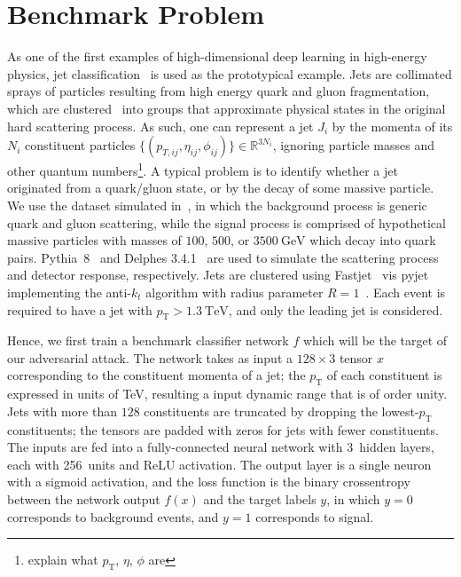 \documentclass[reprint,nofootinbib,...]{revtex4-1}
\newcommand{\nconst}{128}       %
\newcommand{\nlayerCLS}{3}     %
\newcommand{\nunitsCLS}{256} %
\newcommand{\pt}{p_\mathrm{T}} %
\begin{document}
\section{Benchmark Problem}

As one of the first examples of high-dimensional deep learning in high-energy physics, jet classification~\cite{Larkoski:2017jix} is used as the prototypical example.
Jets are collimated sprays of particles resulting from high energy quark and gluon fragmentation, which are clustered~\cite{Cacciari:2008gp} into groups that approximate physical states in the original hard scattering process.
As such, one can represent a jet $J_i$ by the momenta of its $N_i$ constituent particles $\{(p_{T,ij},\eta_{ij},\phi_{ij})\}\in\mathbb{R}^{3N_i}$, ignoring particle masses and other quantum numbers\footnote{explain what $p_\mathrm{T}$, $\eta$, $\phi$ are}.
A typical problem is to identify whether a jet originated from a quark/gluon state, or by the decay of some massive particle.
We use the dataset simulated in~\cite{gregor_kasieczka_2019_2629073}, in which the background process is generic quark and gluon scattering, while the signal process is comprised of hypothetical massive particles with masses of $100$, $500$, or $3500\ \mathrm{GeV}$ which decay into quark pairs.
Pythia~8~\cite{Sjostrand:2006za,Sjostrand:2007gs} and Delphes 3.4.1~\cite{deFavereau:2013fsa} are used to simulate the scattering process and detector response, respectively.
Jets are clustered using Fastjet~\cite{Cacciari:2011ma,Cacciari:2005hq} vis pyjet~\cite{noel_dawe_2019_2672944} implementing the anti-$k_t$ algorithm with radius parameter $R=1$~\cite{Cacciari:2008gp}.
Each event is required to have a jet with $p_\mathrm{T} > 1.3\ \mathrm{TeV}$, and only the leading jet is considered.

Hence, we first train a benchmark classifier network $f$ which will be the target of our adversarial attack.
The network takes as input a $\nconst\times3$ tensor $x$ corresponding to the constituent momenta of a jet; the $\pt$ of each constituent is expressed in units of TeV, resulting a input dynamic range that is of order unity.
Jets with more than $\nconst$ constituents are truncated by dropping the lowest-$\pt$ constituents; the tensors are padded with zeros for jets with fewer constituents.
The inputs are fed into a fully-connected neural network with \nlayerCLS\ hidden layers, each with \nunitsCLS\ units and ReLU activation.
The output layer is a single neuron with a sigmoid activation, and the loss function is the binary crossentropy between the network output $f(x)$ and the target labels $y$, in which $y=0$ corresponds to background events, and $y=1$ corresponds to signal.
\end{document}
